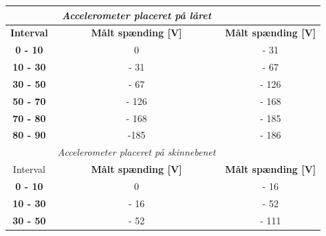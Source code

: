 \begin{table}[H]
\centering
\begin{tabular}{lcc}
                               & \textit{Accelerometer placeret på låret}                           & \multicolumn{1}{l}{}                       \\ \hline
\multicolumn{1}{|c|}{\textbf{Interval}} & \multicolumn{1}{c|}{ \textbf{Målt spænding {[}V{]}}}                         & \multicolumn{1}{l|}{ \textbf{Målt spænding {[}V{]}}} \\ \hline
\multicolumn{1}{|c|}{ \textbf{0 - 10}}   & \multicolumn{1}{c|}{0}                                             & \multicolumn{1}{c|}{- 31}                  \\ \hline
\multicolumn{1}{|c|}{\textbf{10 - 30}}  & \multicolumn{1}{c|}{- 31}                                          & \multicolumn{1}{c|}{- 67}                  \\ \hline
\multicolumn{1}{|c|}{\textbf{30 - 50}} & \multicolumn{1}{c|}{- 67}                                          & \multicolumn{1}{c|}{- 126}                 \\ \hline
\multicolumn{1}{|c|}{\textbf{50 - 70}} & \multicolumn{1}{c|}{- 126}                                         & \multicolumn{1}{c|}{- 168}                 \\ \hline
\multicolumn{1}{|c|}{\textbf{70 - 80}}  & \multicolumn{1}{c|}{- 168}                                         & \multicolumn{1}{c|}{- 185}                 \\ \hline
\multicolumn{1}{|c|}{\textbf{80 - 90}} & \multicolumn{1}{c|}{-185}                                          & \multicolumn{1}{c|}{- 186}                 \\ \hline
                               & \multicolumn{1}{l}{\textit{Accelerometer placeret på skinnebenet}} & \multicolumn{1}{c}{}                       \\ \hline
\multicolumn{1}{|c|}{Interval} & \multicolumn{1}{c|}{\textbf{Målt spænding {[}V{]}}}                         & \multicolumn{1}{c|}{\textbf{Målt spænding {[}V{]}}} \\ \hline
\multicolumn{1}{|c|}{\textbf{0 - 10}}  & \multicolumn{1}{c|}{0}                                             & \multicolumn{1}{c|}{- 16}                  \\ \hline
\multicolumn{1}{|c|}{\textbf{10 - 30}}  & \multicolumn{1}{c|}{- 16}                                          & \multicolumn{1}{c|}{- 52}                  \\ \hline
\multicolumn{1}{|c|}{\textbf{30 - 50}}  & \multicolumn{1}{c|}{- 52}                                          & \multicolumn{1}{c|}{- 111}                 \\ \hline

\end{tabular}
\end{table}
